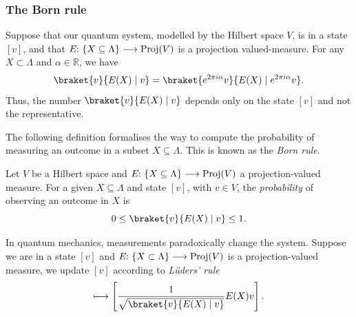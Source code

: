 \documentclass[a4paper, oneside, 12pt]{amsart}
\begin{document}
\subsubsection{The Born rule}\label{sec:the-born-rule}

Suppose that our quantum system, modelled by the Hilbert space \(V\), is in a state \([v]\), and that \(E \from \{X \subseteq \Lambda\} \to \mathrm{Proj}(V)\) is a projection valued-measure.
For any \(X\subset \Lambda\) and \(\alpha\in \mathbb{R}\), we have
\begin{equation*}
  \braket{v}{E(X) \mid v} = \braket{ e^{2\pi i \alpha}v}{E(X) \mid e^{2\pi i \alpha}v}.
\end{equation*}
Thus, the number \(\braket{v}{E(X) \mid v}\) depends only on the state \([v]\) and not the representative.
\bigskip

The following definition formalises the way to compute the probability of measuring an outcome in a subset \( X \subseteq \Lambda \).
This is known as the \emph{Born rule}.
\begin{definition}\label{def:born-rule}
  Let \(V\) be a Hilbert space and \( E \from\{X \subseteq \Lambda\} \to \mathrm{Proj}(V)\) a projection-valued measure.
  For a given \(X \subseteq \Lambda\) and state \( [v]\), with \(v\in V\), the \emph{probability} of observing an outcome in \( X \) is
  \begin{equation}
    0 \leq \braket{v}{E(X) \mid v}\leq 1.
  \end{equation}
\end{definition}

In quantum mechanics, measurements paradoxically change the system.
Suppose we are in a state \([v]\) and \(E \from\{X \subset \Lambda\} \to \mathrm{Proj}(V)\) is a projection-valued measure, we update \([v]\) according to  \emph{Lüders' rule}
\begin{equation}
  [v] \mapsto \left[\frac{1}{\sqrt{\braket{v}{E(X)\mid v}}} E(X)v \right].
\end{equation}
\end{document}
